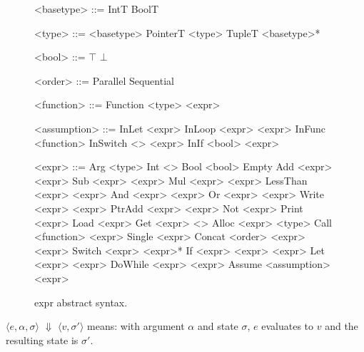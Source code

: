 \begin{figure}%
  \begin{minipage}[t]{0.45\linewidth}
    \begin{grammar}
      <basetype> ::= IntT \alt BoolT

      <type> ::= <basetype> \alt PointerT <type> \alt TupleT <basetype>*

      <bool> ::= $\top$ \alt $\bot$

      <order> ::= Parallel \alt Sequential

      <function> ::= Function <type> <expr>

      <assumption> ::= InLet <expr>
      \alt InLoop <expr> <expr>
      \alt InFunc <function>
      \alt InSwitch <\N> <expr>
      \alt InIf <bool> <expr>
    \end{grammar}
  \end{minipage}\hfill%
  \begin{minipage}[t]{0.5\linewidth}
    \begin{grammar}
      <expr> ::= Arg <type>
      \alt Int <\N>
      \alt Bool <bool>
      \alt Empty
      \alt Add <expr> <expr>
      \alt Sub <expr> <expr>
      \alt Mul <expr> <expr>
      \alt LessThan <expr> <expr>
      \alt And <expr> <expr>
      \alt Or <expr> <expr>
      \alt Write <expr> <expr>
      \alt PtrAdd <expr> <expr>
      \alt Not <expr>
      \alt Print <expr>
      \alt Load <expr>
      \alt Get <expr> <\N>
      \alt Alloc <expr> <type>
      \alt Call <function> <expr>
      \alt Single <expr>
      \alt Concat <order> <expr> <expr>
      \alt Switch <expr> <expr>*
      \alt If <expr> <expr> <expr>
      \alt Let <expr> <expr>
      \alt DoWhile <expr> <expr>
      \alt Assume <assumption> <expr>
    \end{grammar}%
    \end{minipage}%
  \caption{expr abstract syntax.}
\end{figure}

\renewcommand{\inferrule}[3]{\infrule[#1]{\mbox{#2}}{\mbox{#3}}}
\newcommand{\bigstep}[2]{#1 $\Downarrow$ #2}
\newcommand{\ang}[1]{$\langle #1 \rangle$}
\newcommand{\spair}[2]{\ang{#1, #2}}
\newcommand{\strip}[3]{\ang{#1, #2, #3}}

\newcommand{\targ}{\alpha}
\newcommand{\tmem}{\sigma}


\clearpage
\newpage

\bigstep{\strip{e}{\targ}{\tmem}}{\spair{v}{\tmem'}} means: with argument $\targ$ and state $\tmem$, $e$ evaluates to $v$ and the resulting state is $\tmem'$.

